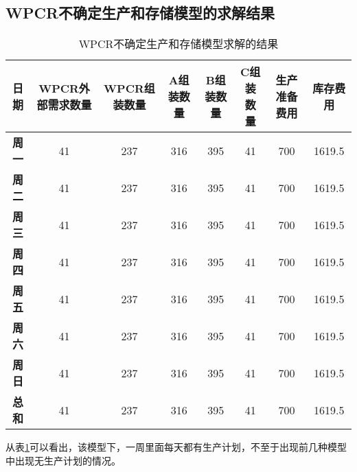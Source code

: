 \subsection{WPCR不确定生产和存储模型的求解结果}
\begin{table}[h]
    \centering
    \renewcommand\arraystretch{1.5} 
    \caption{WPCR不确定生产和存储模型求解的结果}
    \label{T.ch5-1}
    \liuhao
    \begin{tabular}{|c|c|c|c|c|c|c|c|}
        \hline
        \textbf{日期} & \textbf{WPCR外部需求数量}  & \textbf{WPCR组装数量} &\textbf{A组装数量} & \textbf{B组装数量} & \textbf{C组装数量} & \textbf{生产准备费用} & \textbf{库存费用} \\ \hline
        \textbf{周一} & 41 & 237 & 316 & 395 & 41 & 700 & 1619.5 \\ \hline
        \textbf{周二} & 41 & 237 & 316 & 395 & 41 & 700 & 1619.5 \\ \hline
        \textbf{周三} & 41 & 237 & 316 & 395 & 41 & 700 & 1619.5 \\ \hline
        \textbf{周四} & 41 & 237 & 316 & 395 & 41 & 700 & 1619.5 \\ \hline
        \textbf{周五} & 41 & 237 & 316 & 395 & 41 & 700 & 1619.5 \\ \hline
        \textbf{周六} & 41 & 237 & 316 & 395 & 41 & 700 & 1619.5 \\ \hline
        \textbf{周日} & 41 & 237 & 316 & 395 & 41 & 700 & 1619.5 \\ \hline
        \textbf{总和} & 41 & 237 & 316 & 395 & 41 & 700 & 1619.5 \\ \hline 
    \end{tabular}
\end{table}

从表\ref{T.ch5-1}可以看出，该模型下，一周里面每天都有生产计划，不至于出现前几种模型中出现无生产计划的情况。